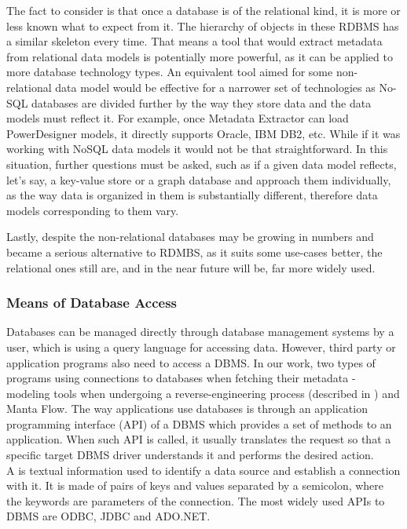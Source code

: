 The fact to consider is that once a database is of the relational kind, it is more or less known what to expect from it.
The hierarchy of objects in these RDBMS has a similar skeleton every time. 
That means a tool that would extract metadata from relational data models is potentially more powerful, as it can be applied to more database technology types.
An equivalent tool aimed for some non-relational data model would be effective for a narrower set of technologies as No-SQL databases are divided further by the way they store data and the data models must reflect it.
For example, once Metadata Extractor can load PowerDesigner models, it directly supports Oracle, IBM DB2, etc.
While if it was working with NoSQL data models it would not be that straightforward. In this situation, further questions must be asked, such as if a given data model reflects, let's say, a key-value store or a graph database and approach them individually, as the way data is organized in them is substantially different, therefore data models corresponding to them vary.

Lastly, despite the non-relational databases may be growing in numbers and became a serious alternative to RDMBS, as it suits some use-cases better, the relational ones still are, and in the near future will be, far more widely used.

\subsubsection{Means of Database Access}

Databases can be managed directly through database management systems by a user, which is using a query language for accessing data. 
However, third party or application programs also need to access a DBMS. 
In our work, two types of programs using connections to databases when fetching their metadata - modeling tools when undergoing a reverse-engineering process (described in ) and Manta Flow.
The way applications use databases is through an application programming interface (API) of a DBMS which provides a set of methods to an application.
When such API is called, it usually translates the request so that a specific target DBMS driver understands it and performs the desired action. \\

A  is textual information used to identify a data source and establish a connection with it. It is made of pairs of keys and values separated by a semicolon, where the keywords are parameters of the connection. The most widely used APIs to DBMS are ODBC, JDBC and ADO.NET.

